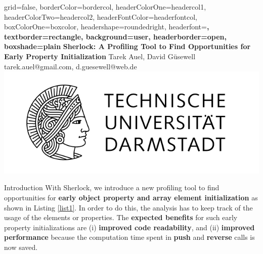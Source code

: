 \documentclass[a1paper,portrait,fontscale=0.418]{baposter}
\begin{document}
\begin{poster}{
grid=false,
borderColor=bordercol, %
headerColorOne=headercol1, %
headerColorTwo=headercol2, %
headerFontColor=headerfontcol, %
boxColorOne=boxcolor, %
headershape=roundedright, %
headerfont=\Large\sf\bf, %
textborder=rectangle,
background=user,
headerborder=open, %
boxshade=plain
}
{}
%
%
{\sf\bf Sherlock: A Profiling Tool to Find Opportunities for Early Property Initialization} %
{\vspace{1em}Tarek Auel, David G\"usewell\\ %
{\smaller tarek.auel@gmail.com, d.guesewell@web.de}} %
{\includegraphics[]{logo}} %


\begin{posterbox}[name=introduction,column=0,row=0]{Introduction}
With Sherlock, we introduce a new profiling tool to find opportunities for \textbf{early object property and array element initialization} as shown in Listing \ref{list1}. In order to do this, the analysis has to keep track of the usage of the elements or properties. The \textbf{expected benefits} for such early property initializations are (i) \textbf{improved code readability}, and (ii) \textbf{improved performance} because the computation time spent in \textbf{push} and \textbf{reverse} calls is now saved.


\end{posterbox}
\end{poster}
\end{document}
